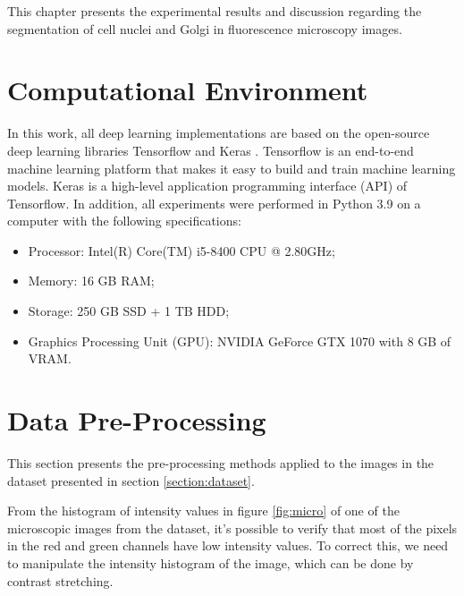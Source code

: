 \label{chap:results}


This chapter presents the experimental results and discussion regarding the segmentation of cell nuclei and Golgi in fluorescence microscopy images.


\section{Computational Environment}

In this work, all deep learning implementations are based on the open-source deep learning libraries Tensorflow and Keras \cite{tensorflow,keras}. Tensorflow is an end-to-end machine learning platform that makes it easy to build and train machine learning models. Keras is a high-level application programming interface (API) of Tensorflow. In addition, all experiments were performed in Python 3.9 on a computer with the following specifications:

\begin{itemize}
    \itemsep0em 
    \item Processor: Intel(R) Core(TM) i5-8400 CPU @ 2.80GHz;
    \item Memory: 16 GB RAM;
    \item Storage: 250 GB SSD + 1 TB HDD;
    \item Graphics Processing Unit (GPU): NVIDIA GeForce GTX 1070 with 8 GB of VRAM.
\end{itemize}


\section{Data Pre-Processing}
\label{section:pre}
This section presents the pre-processing methods applied to the images in the dataset presented in section \ref{section:dataset}.

From the histogram of intensity values in figure \ref{fig:micro} of one of the microscopic images from the dataset, it's possible to verify that most of the pixels in the red and green channels have low intensity values. To correct this, we need to manipulate the intensity histogram of the image, which can be done by contrast stretching.

